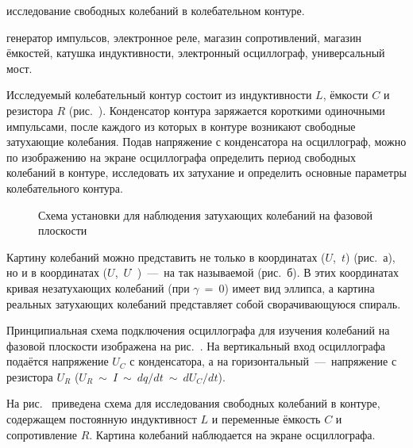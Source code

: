 
\begin{lab:aim}
исследование свободных колебаний в колебательном контуре.
\end{lab:aim}

\begin{lab:equipment}
генератор импульсов, электронное реле, магазин сопротивлений, магазин ёмкостей, катушка индуктивности, электронный осциллограф, универсальный мост.
\end{lab:equipment}

Исследуемый колебательный контур состоит из индуктивности $L$, ёмкости $C$ и резистора $R$ (рис.~). Конденсатор контура заряжается короткими одиночными импульсами, после каждого из которых в контуре возникают свободные затухающие колебания. Подав напряжение с конденсатора на осциллограф, можно по изображению на экране осциллографа определить период свободных колебаний в контуре, исследовать их затухание и определить основные параметры колебательного контура.

\begin{wrapfigure}[13]{r}{0.45\linewidth}
	\caption{Схема установки для наблюдения затухающих колебаний на фазовой плоскости}
\end{wrapfigure}

Картину колебаний можно представить не только в координатах ($U$,~$t$) (рис.~а), но и в координатах ($U$,~$U̇$)~---~на так называемой  (рис.~б). В этих координатах кривая незатухающих колебаний (при $\gamma~=~0$) имеет вид эллипса, а картина реальных затухающих колебаний представляет собой сворачивающуюся спираль.

Принципиальная схема подключения осциллографа для изучения колебаний на фазовой плоскости изображена на рис.~. На вертикальный вход осциллографа подаётся напряжение $U_C$ с конденсатора, а на горизонтальный~---~напряжение с резистора $U_R$ ($U_R ~ {\sim} ~ I~  {\sim}~ dq/dt ~ {\sim}~  dU_C/dt$).

\experiment  На рис.~ приведена схема для исследования свободных колебаний в контуре, содержащем постоянную индуктивност $L$ и переменные ёмкость $C$ и сопротивление $R$. Картина колебаний наблюдается на экране осциллографа.


